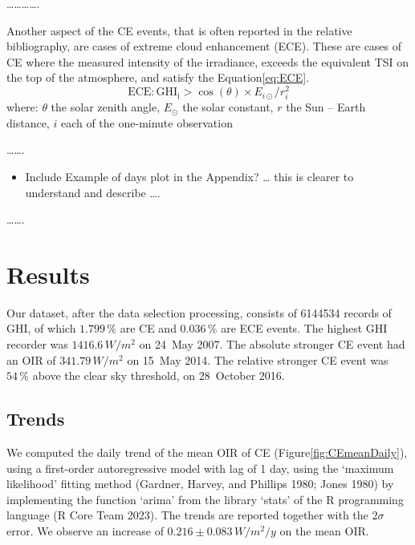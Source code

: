 \documentclass[
]{article}
\providecommand{\tightlist}{%
  \setlength{\itemsep}{0pt}\setlength{\parskip}{0pt}}
\begin{document}
\ldots\ldots\ldots\ldots.

Another aspect of the CE events, that is often reported in the relative bibliography,
are cases of extreme cloud enhancement (ECE). These are cases of CE where the
measured intensity of the irradiance, exceeds the equivalent TSI on the top of the
atmosphere, and satisfy the Equation\nobreakspace{}\ref{eq:ECE}.
\begin{equation}
\text{ECE}: \text{GHI}_\text{i} > \cos(\theta) \times E_{i\odot} / r_{i}^2
\label{eq:ECE}
\end{equation}
where: \(\theta\) the solar zenith angle, \(E_{\odot}\) the solar constant, \(r\) the Sun -- Earth distance, \(i\) each of the one-minute observation

\ldots\ldots.

\begin{itemize}
\tightlist
\item
  Include Example of days plot in the Appendix?
  \ldots{} this is clearer to understand and describe \ldots.
\end{itemize}

\ldots\ldots.

\FloatBarrier

\hypertarget{results}{%
\section{Results}\label{results}}

Our dataset, after the data selection processing, consists of
6144534 records of GHI, of which
\(1.799\,\%\) are CE and
\(0.036\,\%\) are ECE events.
The highest GHI recorder was
\(1416.6\,W/m^2\)
on 24~May 2007.
The absolute stronger CE event had an OIR of
\(341.79\,W/m^2\) on
15~May 2014.
The relative stronger CE event was
\(54\,\%\) above the
clear sky threshold, on
28~October 2016.

\hypertarget{trends}{%
\subsection{Trends}\label{trends}}

We computed the daily trend of the mean OIR of CE
(Figure\nobreakspace{}\ref{fig:CEmeanDaily}), using a first-order autoregressive
model with lag of 1 day, using the `maximum likelihood' fitting method (Gardner, Harvey, and Phillips 1980; Jones 1980) by implementing the function `arima' from the library `stats' of the R
programming language (R Core Team 2023). The trends are reported together with the \(2\sigma\)
error. We observe an increase of
\(0.216\pm 0.083\,W/m^2/y\)
on the mean OIR.
\end{document}
